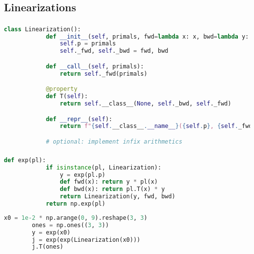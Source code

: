 \documentclass[aspectratio=169,xcolor=dvipsnames]{beamer}
\begin{document}
\subsection{Linearizations}
\begin{frame}[fragile]
	\frametitle{\insertsection}
	\framesubtitle{\insertsubsection}

	\begin{lstlisting}[language=python,escapechar=!]
		class Linearization():
			def __init__(self, primals, fwd=lambda x: x, bwd=lambda y: y):
				self.p = primals
				self._fwd, self._bwd = fwd, bwd

			def __call__(self, primals):
				return self._fwd(primals)

			@property
			def T(self):
				return self.__class__(None, self._bwd, self._fwd)

			def __repr__(self):
				return f"{self.__class__.__name__}({self.p}, {self._fwd}, {self._bwd})"

			# optional: implement infix arithmetics
	\end{lstlisting}

\end{frame}

\begin{frame}[fragile]
	\frametitle{\insertsection}
	\framesubtitle{\insertsubsection}

	\begin{lstlisting}[language=python,escapechar=!]
		def exp(pl):
			if isinstance(pl, Linearization):
				y = exp(pl.p)
				def fwd(x): return y * pl(x)
				def bwd(x): return pl.T(x) * y
				return Linearization(y, fwd, bwd)
			return np.exp(pl)
	\end{lstlisting}

	\begin{lstlisting}[language=python,escapechar=!]
		x0 = 1e-2 * np.arange(0, 9).reshape(3, 3)
		ones = np.ones((3, 3))
		y = exp(x0)
		j = exp(exp(Linearization(x0)))
		j.T(ones)
	\end{lstlisting}

\end{frame}
\end{document}

